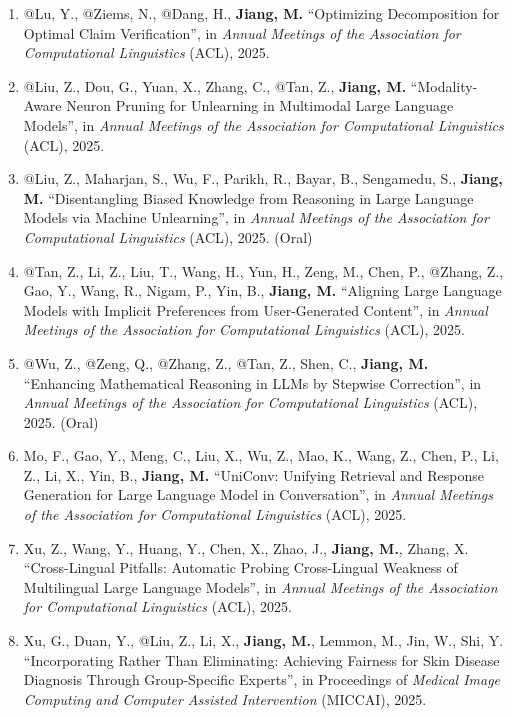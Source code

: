 \documentclass[10pt]{article}
\newenvironment{myindentpar}[1]%
{\begin{list}{}%
         {\setlength{\leftmargin}{#1}}%
         \item[]%
}
{\end{list}}
\newcounter{list}
\begin{document}
\begin{myindentpar}{0.00cm}
\begin{enumerate}[leftmargin=.5cm]
\item[C117] @Lu, Y., @Ziems, N., @Dang, H., \textbf{Jiang, M.} ``Optimizing Decomposition for Optimal Claim Verification'', in \textit{Annual Meetings of the Association for Computational Linguistics} (ACL), 2025.

\item[C116] @Liu, Z., Dou, G., Yuan, X., Zhang, C., @Tan, Z., \textbf{Jiang, M.} ``Modality-Aware Neuron Pruning for Unlearning in Multimodal Large Language Models'', in \textit{Annual Meetings of the Association for Computational Linguistics} (ACL), 2025.

\item[C115] @Liu, Z., Maharjan, S., Wu, F., Parikh, R., Bayar, B., Sengamedu, S., \textbf{Jiang, M.} ``Disentangling Biased Knowledge from Reasoning in Large Language Models via Machine Unlearning'', in \textit{Annual Meetings of the Association for Computational Linguistics} (ACL), 2025. (Oral)

\item[C114] @Tan, Z., Li, Z., Liu, T., Wang, H., Yun, H., Zeng, M., Chen, P., @Zhang, Z., Gao, Y., Wang, R., Nigam, P., Yin, B., \textbf{Jiang, M.} ``Aligning Large Language Models with Implicit Preferences from User-Generated Content'', in \textit{Annual Meetings of the Association for Computational Linguistics} (ACL), 2025.

\item[C113] @Wu, Z., @Zeng, Q., @Zhang, Z., @Tan, Z., Shen, C., \textbf{Jiang, M.} ``Enhancing Mathematical Reasoning in LLMs by Stepwise Correction'', in \textit{Annual Meetings of the Association for Computational Linguistics} (ACL), 2025. (Oral)

\item[C112] Mo, F., Gao, Y., Meng, C., Liu, X., Wu, Z., Mao, K., Wang, Z., Chen, P., Li, Z., Li, X., Yin, B., \textbf{Jiang, M.} ``UniConv: Unifying Retrieval and Response Generation for Large Language Model in Conversation'', in \textit{Annual Meetings of the Association for Computational Linguistics} (ACL), 2025.

\item[C111] Xu, Z., Wang, Y., Huang, Y., Chen, X., Zhao, J., \textbf{Jiang, M.}, Zhang, X. ``Cross-Lingual Pitfalls: Automatic Probing Cross-Lingual Weakness of Multilingual Large Language Models'', in \textit{Annual Meetings of the Association for Computational Linguistics} (ACL), 2025.

\item[C110] Xu, G., Duan, Y., @Liu, Z., Li, X., \textbf{Jiang, M.}, Lemmon, M., Jin, W., Shi, Y. ``Incorporating Rather Than Eliminating: Achieving Fairness for Skin Disease Diagnosis Through Group-Specific Experts'', in Proceedings of \textit{Medical Image Computing and Computer Assisted Intervention} (MICCAI), 2025.


\end{enumerate}
\end{myindentpar}
\end{document}
